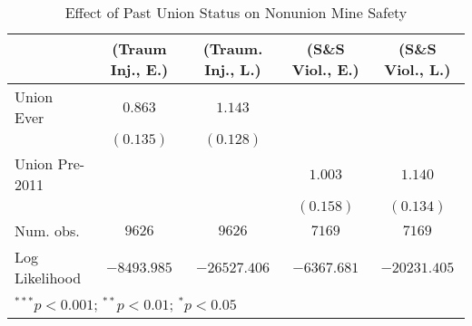
\begin{table}[H]
\begin{center}
\begin{tabular}{l c c c c}
\hline
 & (Traum Inj., E.) & (Traum. Inj., L.) & (S\&S Viol., E.) & (S\&S Viol., L.) \\
\hline
Union Ever     & $0.863$     & $1.143$      &             &              \\
               & $(0.135)$   & $(0.128)$    &             &              \\
Union Pre-2011 &             &              & $1.003$     & $1.140$      \\
               &             &              & $(0.158)$   & $(0.134)$    \\
\hline
Num. obs.      & $9626$      & $9626$       & $7169$      & $7169$       \\
Log Likelihood & $-8493.985$ & $-26527.406$ & $-6367.681$ & $-20231.405$ \\
\hline
\multicolumn{5}{l}{\scriptsize{$^{***}p<0.001$; $^{**}p<0.01$; $^{*}p<0.05$}}
\end{tabular}
\caption{Effect of Past Union Status on Nonunion Mine Safety}
\label{irr_100employees_union_inertia}
\end{center}
\end{table}

